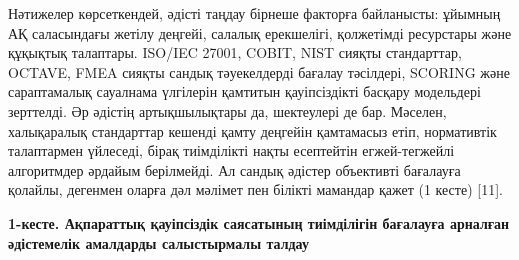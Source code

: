 Нәтижелер көрсеткендей, әдісті таңдау бірнеше факторға байланысты:
ұйымның АҚ саласындағы жетілу деңгейі, салалық ерекшелігі, қолжетімді
ресурстары және құқықтық талаптары. ISO/IEC 27001, COBIT, NIST сияқты
стандарттар, OCTAVE, FMEA сияқты сандық тәуекелдерді бағалау тәсілдері,
SCORING және сараптамалық сауалнама үлгілерін қамтитын қауіпсіздікті
басқару модельдері зерттелді. Әр әдістің артықшылықтары да, шектеулері
де бар. Мәселен, халықаралық стандарттар кешенді қамту деңгейін
қамтамасыз етіп, нормативтік талаптармен үйлеседі, бірақ тиімділікті
нақты есептейтін егжей-тегжейлі алгоритмдер әрдайым берілмейді. Ал
сандық әдістер объективті бағалауға қолайлы, дегенмен оларға дәл мәлімет
пен білікті мамандар қажет (1 кесте) {[}11{]}.

{\bfseries 1-кесте. Ақпараттық қауіпсіздік саясатының тиімділігін бағалауға
арналған әдістемелік амалдарды салыстырмалы талдау}


